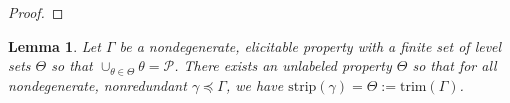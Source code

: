 \documentclass[12pt]{article}
\newcommand{\Comments}{1}
\newcommand{\mynote}[2]{\ifnum\Comments=1\textcolor{#1}{#2}\fi}
\newcommand{\jessie}[1]{\mynote{purple}{[JF: #1]}}
\renewcommand{\P}{\mathcal{P}}
\newcommand{\R}{\mathcal{R}}
\newcommand{\strip}{\mathrm{strip}}
\newtheorem{lemma}{Lemma}
\begin{document}
\begin{proof}
\end{proof}


\begin{lemma}\label{lem:define-trim}
	Let $\Gamma$  be a nondegenerate, elicitable property with a finite set of level sets $\Theta$ so that $\cup_{\theta \in \Theta} \theta = \P$.
	There exists an unlabeled property $\Theta$ so that for all nondegenerate, nonredundant $\gamma \preceq \Gamma$, we have $\strip(\gamma) = \Theta := \text{trim}(\Gamma)$.
\end{lemma}
\end{document}
